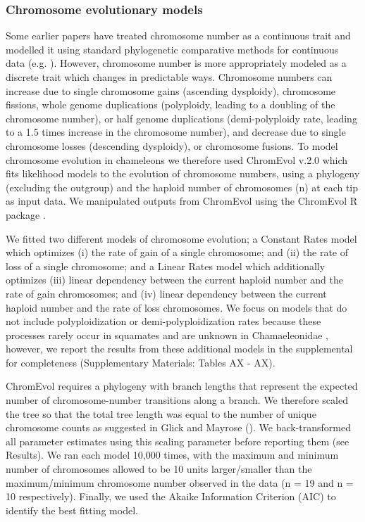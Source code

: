 \documentclass[a4paper, 12pt]{article}
\begin{document}
\subsubsection{Chromosome evolutionary models}
Some earlier papers have treated chromosome number as a continuous trait and modelled it using standard phylogenetic comparative methods for continuous data (e.g. \citealt{vershinina2017evolutionary}). 
However, chromosome number is more appropriately modeled as a discrete trait which changes in predictable ways. 
Chromosome numbers can increase due to single chromosome gains (ascending dysploidy), chromosome fissions, whole genome duplications (polyploidy, leading to a doubling of the chromosome number), or half genome duplications (demi-polyploidy rate, leading to a 1.5 times increase in the chromosome number), and decrease due to single chromosome losses (descending dysploidy), or chromosome fusions. 
To model chromosome evolution in chameleons we therefore used ChromEvol v.2.0 \citep{glick2014chromevol,mayrose2010probabilistic} which fits likelihood models to the evolution of chromosome numbers, using a phylogeny (excluding the outgroup) and the haploid number of chromosomes (n) at each tip as input data. 
We manipulated outputs from ChromEvol using the ChromEvol R package \citep{chromevol}.

We fitted two different models of chromosome evolution; a Constant Rates model which optimizes (i) the rate of gain of a single chromosome; and (ii) the rate of loss of a single chromosome; and a Linear Rates model which additionally optimizes (iii) linear dependency between the current haploid number and the rate of gain chromosomes; and (iv) linear dependency between the current haploid number and the rate of loss chromosomes. 
We focus on models that do not include polyploidization or demi-polyploidization rates because these processes rarely occur in squamates and are unknown in Chamaeleonidae \citep{bogart1980evolutionary,mezzasalma2021lizards}, however, we report the results from these additional models in the supplemental for completeness (Supplementary Materials: Tables AX - AX). 

ChromEvol requires a phylogeny with branch lengths that represent the expected number of chromosome-number transitions along a branch. We therefore scaled the tree so that the total tree length was equal to the number of unique chromosome counts as suggested in Glick and Mayrose (\citeyear{glick2014chromevol}). 
We back-transformed all parameter estimates using this scaling parameter before reporting them (see Results). 
We ran each model 10,000 times, with the maximum and minimum number of chromosomes allowed to be 10 units larger/smaller than the maximum/minimum chromosome number observed in the data (n = 19 and n = 10 respectively). 
Finally, we used the Akaike Information Criterion (AIC) to identify the best fitting model. 
\end{document}
